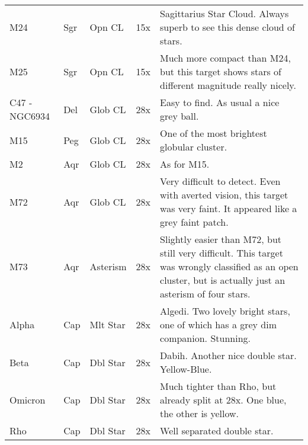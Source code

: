 \begin{longtable}{ p{0.7in}  p{0.3in}  p{0.6in}  p{0.9in}  p{5.8in} }
M24 & Sgr & Opn CL & 15x & Sagittarius Star Cloud. Always superb to see this dense cloud of stars.  \\ 
M25 & Sgr & Opn CL & 15x & Much more compact than M24, but this target shows stars of different magnitude really nicely. \\ 
C47 - NGC6934 & Del & Glob CL & 28x & Easy to find. As usual a nice grey ball. \\ 
M15 & Peg & Glob CL & 28x & One of the most brightest globular cluster.  \\ 
M2 & Aqr & Glob CL & 28x & As for M15. \\ 
M72 & Aqr & Glob CL & 28x & Very difficult to detect. Even with averted vision, this target was very faint. It appeared like a grey faint patch. \\ 
M73 & Aqr & Asterism & 28x & Slightly easier than M72, but still very difficult. This target was wrongly classified as an open cluster, but is actually just an asterism of four stars.  \\ 
Alpha & Cap & Mlt Star & 28x & Algedi. Two lovely bright stars, one of which has a grey dim companion. Stunning. \\ 
Beta & Cap & Dbl Star & 28x & Dabih. Another nice double star. Yellow-Blue. \\ 
Omicron & Cap & Dbl Star & 28x & Much tighter than Rho, but already split at 28x. One blue, the other is yellow. \\ 
Rho & Cap & Dbl Star & 28x & Well separated double star. \\ 
\hline 
\end{longtable} 
